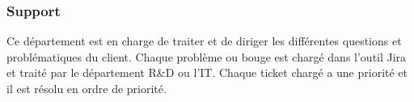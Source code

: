 \subsubsection{Support}
Ce département est en charge de traiter et de diriger les différentes questions
et problématiques du client.
Chaque problème ou bouge est chargé dans l'outil Jira et traité par le département
R\&D ou l'IT.
Chaque ticket chargé a une priorité et il est résolu en ordre de priorité.
